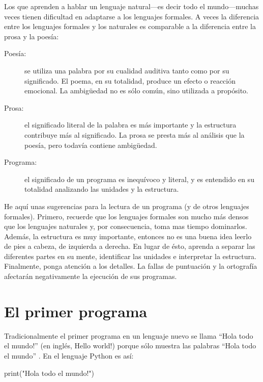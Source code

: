 Los que aprenden a hablar un lenguaje natural---es decir todo el 
mundo---muchas
veces tienen dificultad en adaptarse a los lenguajes formales. A veces
la diferencia entre los lenguajes formales y los naturales es 
comparable
a la diferencia entre la prosa y la poesía:


\begin{description}
	\item[Poesía:] se utiliza una palabra por su cualidad auditiva
	tanto como por su significado. El poema, en su totalidad, produce
	un efecto o reacción emocional. La ambigüedad no es sólo común, sino
	utilizada a propósito.
	\item[Prosa:] el significado literal de la palabra es más importante
	y la estructura contribuye más al significado. La prosa se presta
	más al análisis que la poesía, pero todavía contiene ambigüedad.
	\item[Programa:] el significado de un programa es inequívoco y
	literal, y es entendido en su totalidad analizando las unidades y
	la estructura.
\end{description}

He aquí unas sugerencias para la lectura de un programa (y de otros
lenguajes formales). Primero, recuerde que los lenguajes formales
son mucho más densos que los lenguajes naturales y, por consecuencia,
toma mas tiempo dominarlos. Además, la estructura es muy
importante, entonces no es una buena idea leerlo de pies a cabeza,
de izquierda a derecha. En lugar de ésto, aprenda a separar las diferentes
partes en su mente, identificar las unidades e interpretar la
estructura. Finalmente, ponga atención a los detalles. La fallas
de puntuación y la ortografía afectarán negativamente la ejecución de 
sus programas.

\section{El primer programa}
\label{hello}
\label{hello world}


Tradicionalmente el primer programa en un lenguaje nuevo se llama
``Hola todo el mundo!'' (en inglés, Hello world!) porque sólo muestra las
palabras ``Hola todo el mundo'' . En el lenguaje Python es así:

\beforeverb
\begin{pythoncode}
print("Hola todo el mundo!")
\end{pythoncode}
\afterverb
%

